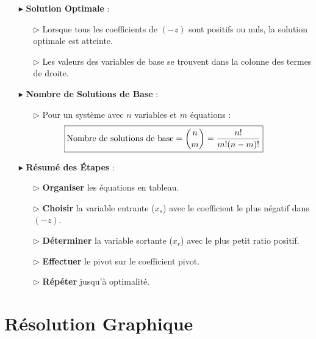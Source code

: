 \documentclass{report}
\begin{document}
\begin{multicols*}{2}
\begin{itemize}
    
    \item[$\blacktriangleright$] \textbf{Solution Optimale} :
    \begin{itemize}
        \item[$\rhd$] Lorsque tous les coefficients de $(-z)$ sont positifs ou nuls, la solution optimale est atteinte.
        \item[$\rhd$] Les valeurs des variables de base se trouvent dans la colonne des termes de droite.
    \end{itemize}
    
    \item[$\blacktriangleright$] \textbf{Nombre de Solutions de Base} :
\hspace{-4em}
    \begin{itemize}
        \item[$\rhd$] Pour un système avec $n$ variables et $m$ équations :
        \[
            \hspace{-2em}\boxed{\text{Nombre de solutions de base} = {n \choose m} = \dfrac{n!}{m!(n-m)!}}
        \]
    \end{itemize}
    
    \item[$\blacktriangleright$] \textbf{Résumé des Étapes} :
    \begin{enumerate}
        \item[$\rhd$] \textbf{Organiser} les équations en tableau.
        \item[$\rhd$] \textbf{Choisir} la variable entrante ($x_s$) avec le coefficient le plus négatif dans $(-z)$.
        \item[$\rhd$] \textbf{Déterminer} la variable sortante ($x_r$) avec le plus petit ratio positif.
        \item[$\rhd$] \textbf{Effectuer} le pivot sur le coefficient pivot.
        \item[$\rhd$] \textbf{Répéter} jusqu'à optimalité.
    \end{enumerate}
\end{itemize}

\section{Résolution Graphique}


\end{multicols*}
\end{document}
